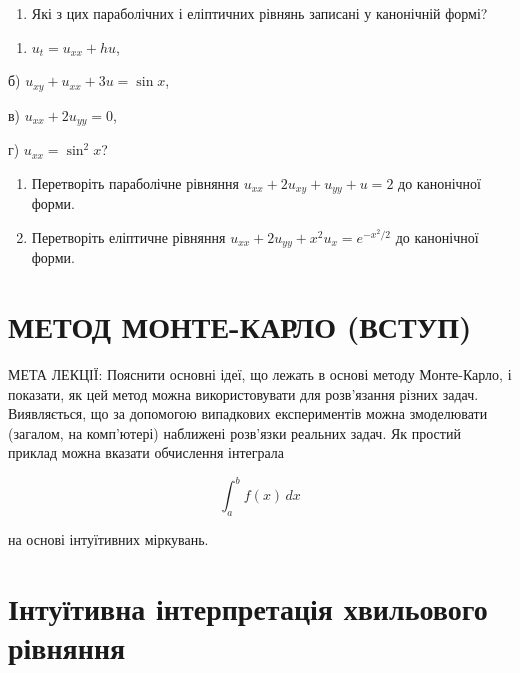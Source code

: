 \documentclass[
  ukrainian,
]{article}
\providecommand{\tightlist}{%
  \setlength{\itemsep}{0pt}\setlength{\parskip}{0pt}}
\begin{document}
\begin{enumerate}
\def\labelenumi{\arabic{enumi}.}
\tightlist
\item
  Які з цих параболічних і еліптичних рівнянь записані у канонічній
  формі?
\end{enumerate}

\begin{enumerate}
\def\labelenumi{\alph{enumi})}
\tightlist
\item
  \(u_t = u_{xx} + hu\),
\end{enumerate}

б) \(u_{xy} + u_{xx} + 3u = \sin x\),

в) \(u_{xx} + 2u_{yy} = 0\),

г) \(u_{xx} = \sin^2 x\)?

\begin{enumerate}
\def\labelenumi{\arabic{enumi}.}
\setcounter{enumi}{1}
\item
  Перетворіть параболічне рівняння \(u_{xx} + 2u_{xy} + u_{yy} + u = 2\)
  до канонічної форми.
\item
  Перетворіть еліптичне рівняння
  \(u_{xx} + 2u_{yy} + x^2 u_x = e^{-x^2/2}\) до канонічної форми.
\end{enumerate}

\section{МЕТОД МОНТЕ-КАРЛО
(ВСТУП)}\label{ux43cux435ux442ux43eux434-ux43cux43eux43dux442ux435-ux43aux430ux440ux43bux43e-ux432ux441ux442ux443ux43f}

МЕТА ЛЕКЦІЇ: Пояснити основні ідеї, що лежать в основі методу
Монте-Карло, і показати, як цей метод можна використовувати для
розв'язання різних задач. Виявляється, що за допомогою випадкових
експериментів можна змоделювати (загалом, на комп'ютері) наближені
розв'язки реальних задач. Як простий приклад можна вказати обчислення
інтеграла

\[
\int_a^b f(x)\,dx
\]

на основі інтуїтивних міркувань.

\section{Інтуїтивна інтерпретація хвильового
рівняння}\label{ux456ux43dux442ux443ux457ux442ux438ux432ux43dux430-ux456ux43dux442ux435ux440ux43fux440ux435ux442ux430ux446ux456ux44f-ux445ux432ux438ux43bux44cux43eux432ux43eux433ux43e-ux440ux456ux432ux43dux44fux43dux43dux44f}
\end{document}

